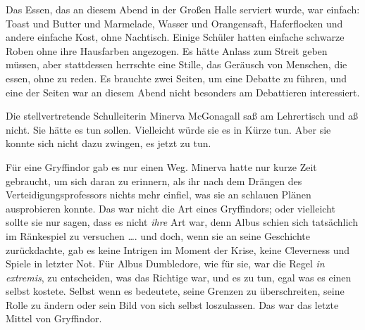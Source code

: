 Das Essen, das an diesem Abend in der Großen Halle serviert wurde, war einfach: Toast und Butter und Marmelade, Wasser und Orangensaft, Haferflocken und andere einfache Kost, ohne Nachtisch. Einige Schüler hatten einfache schwarze Roben ohne ihre Hausfarben angezogen. Es hätte Anlass zum Streit geben müssen, aber stattdessen herrschte eine Stille, das Geräusch von Menschen, die essen, ohne zu reden. Es brauchte zwei Seiten, um eine Debatte zu führen, und eine der Seiten war an diesem Abend nicht besonders am Debattieren interessiert.

Die stellvertretende Schulleiterin Minerva McGonagall saß am Lehrertisch und aß nicht. Sie hätte es tun sollen. Vielleicht würde sie es in Kürze tun. Aber sie konnte sich nicht dazu zwingen, es jetzt zu tun.

Für eine Gryffindor gab es nur einen Weg. Minerva hatte nur kurze Zeit gebraucht, um sich daran zu erinnern, als ihr nach dem Drängen des Verteidigungsprofessors nichts mehr einfiel, was sie an schlauen Plänen ausprobieren konnte. Das war nicht die Art eines Gryffindors; oder vielleicht sollte sie nur sagen, dass es nicht \emph{ihre} Art war, denn Albus schien sich tatsächlich im Ränkespiel zu versuchen …. und doch, wenn sie an seine Geschichte zurückdachte, gab es keine Intrigen im Moment der Krise, keine Cleverness und Spiele in letzter Not. Für Albus Dumbledore, wie für sie, war die Regel \emph{in extremis}, zu entscheiden, was das Richtige war, und es zu tun, egal was es einen selbst kostete. Selbst wenn es bedeutete, seine Grenzen zu überschreiten, seine Rolle zu ändern oder sein Bild von sich selbst loszulassen. Das war das letzte Mittel von Gryffindor.

